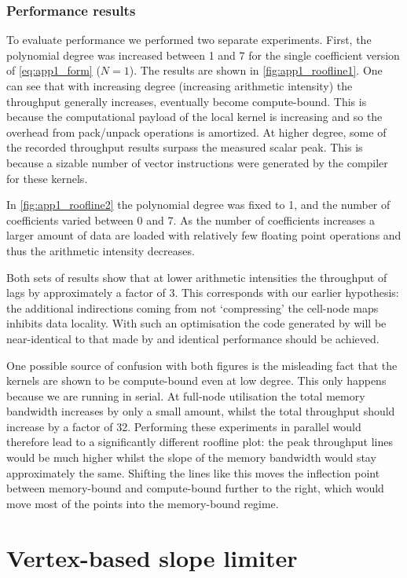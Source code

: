 \documentclass[thesis]{subfiles}
\begin{document}
\subsubsection{Performance results}

To evaluate performance we performed two separate experiments.
First, the polynomial degree was increased between 1 and 7 for the single coefficient version of \cref{eq:app1_form} ($N=1$).
The results are shown in \cref{fig:app1_roofline1}.
One can see that with increasing degree (increasing arithmetic intensity) the throughput generally increases, eventually become compute-bound.
This is because the computational payload of the local kernel is increasing and so the overhead from pack/unpack operations is amortized.
At higher degree, some of the recorded throughput results surpass the measured scalar peak.
This is because a sizable number of vector instructions were generated by the compiler for these kernels.

In \cref{fig:app1_roofline2} the polynomial degree was fixed to 1, and the number of coefficients varied between 0 and 7.
As the number of coefficients increases a larger amount of data are loaded with relatively few floating point operations and thus the arithmetic intensity decreases.

Both sets of results show that at lower arithmetic intensities the throughput of  lags  by approximately a factor of 3.
This corresponds with our earlier hypothesis: the additional indirections coming from not `compressing' the cell-node maps inhibits data locality.
With such an optimisation the code generated by  will be near-identical to that made by  and identical performance should be achieved.

One possible source of confusion with both figures is the misleading fact that the kernels are shown to be compute-bound even at low degree.
This only happens because we are running in serial.
At full-node utilisation the total memory bandwidth increases by only a small amount, whilst the total throughput should increase by a factor of 32.
Performing these experiments in parallel would therefore lead to a significantly different roofline plot: the peak throughput lines would be much higher whilst the slope of the memory bandwidth would stay approximately the same.
Shifting the lines like this moves the inflection point between memory-bound and compute-bound further to the right, which would move most of the points into the memory-bound regime.

\section{Vertex-based slope limiter}
\label{sec:demo_apps_slope_limiter}
\end{document}
